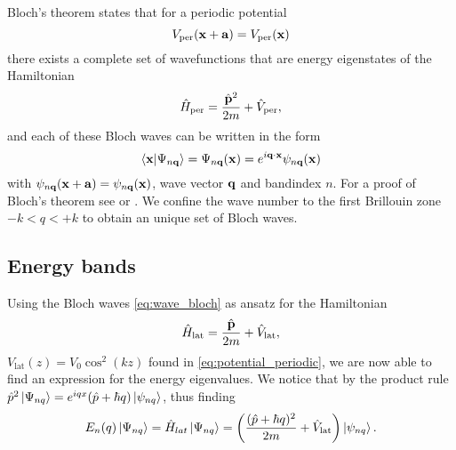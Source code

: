 Bloch's theorem states that for a periodic potential
\begin{equation}
  V_\text{per}(\vb{x}+\vb{a})=V_\text{per}(\vb{x})
  \label{eq:potential_periodic}
\end{equation}
there exists a complete set of wavefunctions that are energy eigenstates
of the Hamiltonian
\begin{equation}
  \hat{H}_\text{per}
  =\frac{\hat{\vb{p}}^2}{2m}+\hat{V}_\text{per}
  \label{eq:hamiltonian_periodic},
\end{equation}
and each of these Bloch waves can be written in the form
\begin{equation}
  \bra{\vb{x}}\ket{\Psi_{n\vb{q}}}
  =\Psi_{n\vb{q}}(\vb{x})
  =e^{i\vb{q}\cdot\vb{x}}\psi_{n\vb{q}}(\vb{x})
  \label{eq:wave_bloch}
\end{equation}
with $\psi_{n\vb{q}}(\vb{x}+\vb{a})=\psi_{n\vb{q}}(\vb{x})$, wave vector
$\vb{q}$ and bandindex $n$. For a proof of Bloch's theorem see
\cite{Roessler2004} or \cite{Bartelmann2018}. We confine the wave number to
the first Brillouin zone $-k<q<+k$ to obtain an unique set of Bloch waves.

\subsection{Energy bands}

Using the Bloch waves \cref{eq:wave_bloch} as ansatz for the Hamiltonian
\begin{equation}
  \hat{H}_\text{lat}
  =\frac{\hat{\vb{p}}}{2m}+\hat{V}_\text{lat}
  \label{eq:hamiltonian_lattice},
\end{equation}
$V_\text{lat}(z)=V_0\cos^2(kz)$ found in \cref{eq:potential_periodic}, we are
now able to find an expression for the energy eigenvalues. We notice that by
the product rule
$\hat{p}^2\ket{\Psi_{nq}}=e^{iqx}(\hat{p}+\hbar q)\ket{\psi_{nq}}$,
thus finding
\begin{equation}
  E_n(q)\ket{\Psi_{nq}}
  =\hat{H}_{lat}\ket{\Psi_{nq}}
  =\left(\frac{(\hat{p}+\hbar q)^2}{2m}+\hat{V}_\text{lat}\right)\ket{\psi_{nq}}
  \label{eq:eigenvalue_energy_lattice}.
\end{equation}

